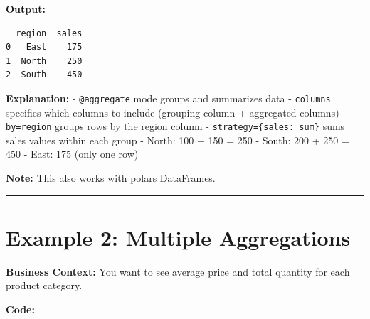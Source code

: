 \documentclass[
  letterpaper,
]{scrbook}
\begin{document}
\textbf{Output:}

\begin{verbatim}
  region  sales
0   East    175
1  North    250
2  South    450
\end{verbatim}

\textbf{Explanation:} -
\texttt{\textquotesingle{}@aggregate\textquotesingle{}} mode groups and
summarizes data - \texttt{columns} specifies which columns to include
(grouping column + aggregated columns) -
\texttt{by=\textquotesingle{}region\textquotesingle{}} groups rows by
the region column -
\texttt{strategy=\{\textquotesingle{}sales\textquotesingle{}:\ \textquotesingle{}sum\textquotesingle{}\}}
sums sales values within each group - North: 100 + 150 = 250 - South:
200 + 250 = 450 - East: 175 (only one row)

\textbf{Note:} This also works with polars DataFrames.

\begin{center}\rule{0.5\linewidth}{0.5pt}\end{center}

\section{Example 2: Multiple
Aggregations}\label{example-2-multiple-aggregations}

\textbf{Business Context:} You want to see average price and total
quantity for each product category.

\textbf{Code:}
\end{document}
